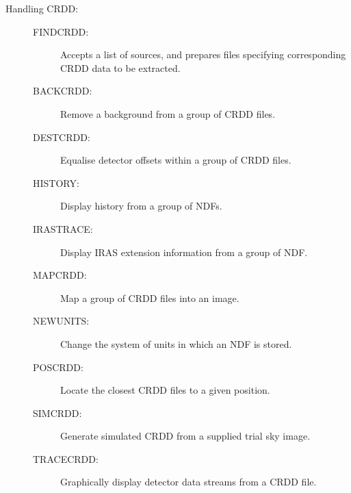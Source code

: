 \documentclass[twoside,11pt]{starlink}
\begin{document}
\begin{description}
\item [Handling CRDD:]
\mbox{}
\begin{description}
\item[FINDCRDD: ]    Accepts a list of sources, and prepares files specifying
corresponding CRDD data to be extracted.
\item[BACKCRDD: ] Remove a background from a group of CRDD files.
\item[DESTCRDD: ] Equalise detector offsets within a group of CRDD files.
\item[HISTORY:  ] Display history from a group of NDFs.
\item[IRASTRACE:] Display IRAS extension information from a group of NDF.
\item[MAPCRDD:  ] Map a group of CRDD files into an image.
\item[NEWUNITS: ] Change the system of units in which an NDF is stored.
\item[POSCRDD:  ] Locate the closest CRDD files to a given position.
\item[SIMCRDD:  ] Generate simulated CRDD from a supplied trial sky image.
\item[TRACECRDD: ] Graphically display detector data streams from a CRDD
file.
\end{description}


\end{description}
\end{document}
